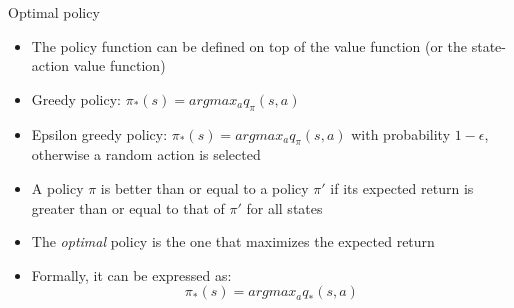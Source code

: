 \documentclass[presentation, 9pt]{beamer}\mode<presentation>{\usetheme{AMSBolognaFC}}
\begin{document}
\begin{frame}{Optimal policy}
\begin{itemize}
	\item The policy function can be defined on top of the value function (or the state-action value function)
	\item Greedy policy: $\pi_*(s) = argmax_a q_\pi(s,a)$ 
	\item Epsilon greedy policy: $\pi_*(s) = argmax_a q_\pi(s,a)$ with probability $1-\epsilon$, otherwise a random action is selected
	\item A policy $\pi$ is better than or equal to a policy $\pi'$ if its expected return is greater than or equal to that of $\pi'$ for all states
	\item The \emph{optimal} policy is the one that maximizes the expected return
	\item Formally, it can be expressed as:
	\begin{equation*}
		\pi_*(s) = argmax_a q_*(s,a)
	\end{equation*}
\end{itemize}
\end{frame}
\end{document}
